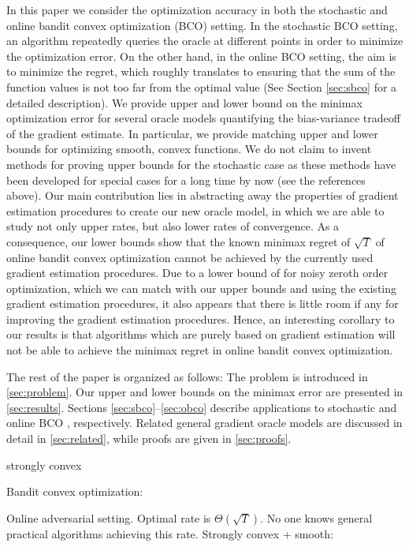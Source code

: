 In this paper we consider the optimization accuracy in both the stochastic and online bandit convex optimization (BCO) setting.
In the stochastic BCO setting, an algorithm repeatedly queries the oracle at different points in order to minimize the optimization error. On the other hand, in the online BCO setting, the aim is to minimize the regret, which roughly translates to ensuring that the sum of the function values is not too far from the optimal value (See Section \ref{sec:sbco} for a detailed description).
We  provide upper and lower bound on the minimax optimization error for several oracle models quantifying the bias-variance tradeoff of the gradient estimate. In particular, we provide matching upper and lower bounds for optimizing smooth, convex functions. We do not claim to invent methods for proving upper bounds for the stochastic case
as these methods have been developed for special cases for a long time by now (see the references above).
Our main contribution lies in abstracting away the properties of gradient estimation procedures 
to create our new oracle model, in which we are able to study not only upper rates, but also lower rates of convergence.
As a consequence, our lower bounds show that the known minimax regret of $\sqrt{T}$ \citep{BubeckDKP15,BuEl15}
of online bandit convex optimization cannot be achieved by the currently used gradient estimation procedures.
Due to a lower bound of \citet{Chen88:LB-AoS} for noisy zeroth order optimization,
which we can match with our upper bounds  and using the existing gradient estimation procedures, 
it also appears that there is little room if any for improving the gradient estimation procedures. Hence,
an interesting corollary to our results is that algorithms which are purely based on gradient estimation 
will not be able to achieve the minimax regret in online bandit convex optimization.

The rest of the paper is organized as follows: The problem is introduced in \cref{sec:problem}. Our upper and lower bounds on the minimax error are presented in \cref{sec:results}. Sections \ref{sec:sbco}--\ref{sec:obco} describe applications to stochastic and online BCO , respectively. Related general gradient oracle models are discussed in detail in \cref{sec:related}, while proofs are given in \cref{sec:proofs}.

strongly convex


Bandit convex optimization:

Online adversarial setting. Optimal rate is $\Theta(\sqrt{T})$.
No one knows general practical algorithms achieving this rate.
Strongly convex + smooth: \cite{hazan2014bandit}

